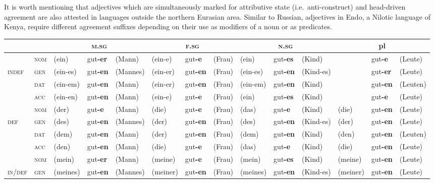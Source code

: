 It is worth mentioning that adjectives which are simultaneously marked for attributive state (i.e.~anti-construct) and head-driven agreement are also attested in languages outside the northern Eurasian area. Similar to Russian, adjectives in Endo, a Nilotic language of Kenya, require different agreement suffixes depending on their use as modifiers of a noun or as predicates.
\begin{landscape}
\begin{table}
\begin{footnotesize}
\begin{tabular}{|ll|lll|lll|lll|lll|}
\lsptoprule
&&\multicolumn{3}{|c|}{\textsc{m.sg}}&\multicolumn{3}{|c|}{\textsc{f.sg}}&\multicolumn{3}{|c|}{\textsc{n.sg}}&\multicolumn{3}{|c|}{pl}\\
\midrule
&\textsc{nom}&(ein)&gut\textbf{-er}&(Mann)&(ein-e)&gut\textbf{-e}&(Frau)&(ein)&gut\textbf{-es}&(Kind)&&gut\textbf{-e}&(Leute)\\
\textsc{indef}&\textsc{gen}&(ein-es)&gut\textbf{-en}&(Mannes)&(ein-er)&gut\textbf{-en}&(Frau)&(ein-es)&gut\textbf{-en}&(Kind-es)&&gut\textbf{-er}&(Leute)\\
&\textsc{dat}&(ein-em)&gut\textbf{-en}&(Mann)&(ein-er)&gut\textbf{-en}&(Frau)&(ein-em)&gut\textbf{-en}&(Kind)&&gut\textbf{-en}&(Leuten)\\
&\textsc{acc}&(ein-en)&gut\textbf{-en}&(Mann)&(ein-e)&gut\textbf{-e}&(Frau)&(ein)&gut\textbf{-es}&(Kind)&&gut\textbf{-e}&(Leute)\\
\midrule
&\textsc{nom}&(der)&gut\textbf{-e}&(Mann)&(die)&gut\textbf{-e}&(Frau)&(das)&gut\textbf{-e}&(Kind)&(die)&gut\textbf{-en}&(Leute)\\
\textsc{def}&\textsc{gen}&(des)&gut\textbf{-en}&(Mannes)&(der)&gut\textbf{-en}&(Frau)&(des)&gut\textbf{-en}&(Kind-es)&(der)&gut\textbf{-en}&(Leute)\\
&\textsc{dat}&(dem)&gut\textbf{-en}&(Mann)&(der)&gut\textbf{-en}&(Frau)&(dem)&gut\textbf{-en}&(Kind)&(den)&gut\textbf{-en}&(Leuten)\\
&\textsc{acc}&(den)&gut\textbf{-en}&(Mann)&(die)&gut\textbf{-e}&(Frau)&(das)&gut\textbf{-e}&(Kind)&(die)&gut\textbf{-en}&(Leute)\\
\midrule
&\textsc{nom}&(mein)&gut\textbf{-er}&(Mann)&(meine)&gut\textbf{-e}&(Frau)&(mein)&gut\textbf{-es}&(Kind)&(meine)&gut\textbf{-en}&(Leute)\\
\textsc{in/def}&\textsc{gen}&(meines)&gut\textbf{-en}&(Mannes)&(meiner)&gut\textbf{-en}&(Frau)&(meines)&gut\textbf{-en}&(Kind-es)&(meiner)&gut\textbf{-en}&(Leute)\\

\end{tabular}
\end{footnotesize}
\end{table}
\end{landscape}

